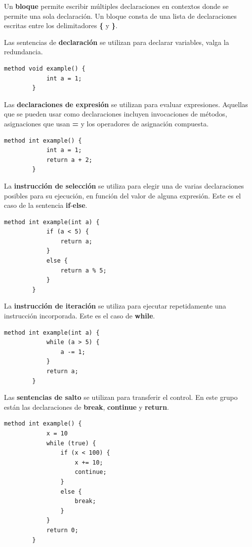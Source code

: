 \documentclass[12pt, letterpaper,spanish]{article}
\theoremstyle{definition}
\theoremstyle{remark}
\begin{document}
	Un \textbf{bloque} permite escribir múltiples declaraciones en contextos donde se permite una sola declaración. Un bloque consta de una lista de declaraciones escritas entre los delimitadores \textbf{\{} y \textbf{\}}.
	
	Las sentencias de \textbf{declaración} se utilizan para declarar variables, valga la redundancia.
	
	\begin{lstlisting}[language={PySharp}]
		method void example() {
			int a = 1;
		}
	\end{lstlisting}
	
	Las \textbf{declaraciones de expresión} se utilizan para evaluar expresiones. Aquellas que se pueden usar como declaraciones incluyen invocaciones de métodos, asignaciones que usan \textbf{=} y los operadores de asignación compuesta.
	
	\begin{lstlisting}[language={PySharp}]
		method int example() {
			int a = 1;
			return a + 2;
		}
	\end{lstlisting}
	
	La \textbf{instrucción de selección} se utiliza para elegir una de varias declaraciones posibles para su ejecución, en función del valor de alguna expresión. Este es el caso de la sentencia \textbf{if}-\textbf{else}.
	
	\begin{lstlisting}[language={PySharp}]
		method int example(int a) {
			if (a < 5) {
				return a;
			}
			else {
				return a % 5;
			}
		}
	\end{lstlisting}
	
	La \textbf{instrucción de iteración} se utiliza para ejecutar repetidamente una instrucción incorporada. Este es el caso de \textbf{while}.
	
	\begin{lstlisting}[language={PySharp}]
		method int example(int a) {
			while (a > 5) {				
				a -= 1;
			}
			return a;
		}
	\end{lstlisting}
	
	Las \textbf{sentencias de salto} se utilizan para transferir el control. En este grupo están las declaraciones de \textbf{break}, \textbf{continue} y \textbf{return}.
	
	\begin{lstlisting}[language={PySharp}]
		method int example() {
			x = 10
			while (true) {				
				if (x < 100) {
					x += 10;
					continue;
				}
				else {
					break;
				}
			}
			return 0;
		}
	\end{lstlisting}
	
\end{document}
